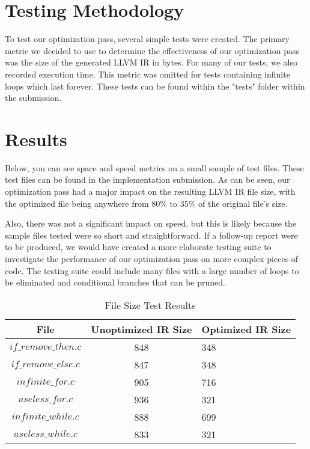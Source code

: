 \documentclass[sigconf]{acmart}
\begin{document}
\section{Testing Methodology}
To test our optimization pass, several simple tests were created. The primary metric 
we decided to use to determine the effectiveness of our optimization pass was the size of the generated 
LLVM IR in bytes. For many of our tests, we also recorded execution time. This metric was omitted 
for tests containing infinite loops which last forever. These tests can be found within 
the "tests" folder within the submission.



\section{Results}
Below, you can see space and speed metrics on a small sample of test files. These test files can 
be found in the implementation submission.
As can be seen, our optimization pass had a major impact on the resulting LLVM IR file size, with the 
optimized file being anywhere from 80\% to 35\% of the original file's size. 

Also, there was not a significant impact on speed, but this is likely because the sample files tested were so 
short and straightforward. If a follow-up report were to be produced, we would have created a more 
elaborate testing suite to investigate the performance of our optimization pass on more complex 
pieces of code. The testing suite could include many files with a large number of loops to be 
eliminated and conditional branches that can be pruned.



\begin{table*}
  \caption{File Size Test Results}
  \begin{tabular}{ccl}
    \toprule
    File & Unoptimized IR Size & Optimized IR Size \\
    \midrule
    \texttt{$if\_remove\_then.c$}& 848& 348 \\
    \texttt{$if\_remove\_else.c$}&  847& 348\\
    \texttt{$infinite\_for.c$}& 905& 716 \\
    \texttt{$useless\_for.c$}& 936& 321  \\
    \texttt{$infinite\_while.c$}& 888 & 699 \\
    \texttt{$useless\_while.c$}& 833 & 321  \\
    \bottomrule
  \end{tabular}
\end{table*}
\end{document}
